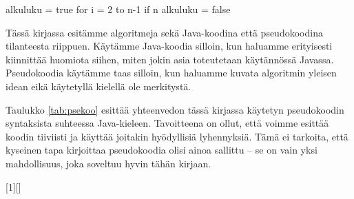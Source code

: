 \begin{code}
alkuluku = true
for i = 2 to n-1
    if n%
        alkuluku = false
\end{code}

Tässä kirjassa esitämme algoritmeja sekä Java-koodina että pseudokoodina
tilanteesta riippuen.
Käytämme Java-koodia silloin, kun haluamme erityisesti kiinnittää huomiota siihen,
miten jokin asia toteutetaan käytännössä Javassa.
Pseudokoodia käytämme taas silloin, kun haluamme kuvata algoritmin yleisen
idean eikä käytetyllä kielellä ole merkitystä.

Taulukko \ref{tab:psekoo} esittää yhteenvedon tässä kirjassa käytetyn pseudokoodin syntaksista
suhteessa Java-kieleen.
Tavoitteena on ollut, että voimme esittää koodin tiiviisti ja
käyttää joitakin hyödyllisiä lyhennyksiä.
Tämä ei tarkoita, että kyseinen tapa kirjoittaa pseudokoodia olisi ainoa sallittu --
se on vain yksi mahdollisuus, joka soveltuu hyvin tähän kirjaan.

[1][]%
{
   \noindent
   \small
   \vspace{0.5\baselineskip}
   \lstset{#1,xleftmargin=0pt}}
{\endminipage}

